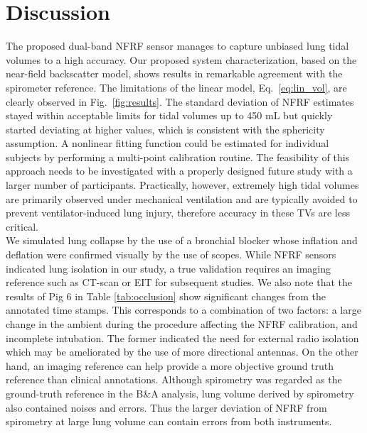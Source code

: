 \documentclass[journal]{IEEEtran}
\begin{document}
\section{Discussion}
The proposed dual-band NFRF sensor manages to capture unbiased lung tidal volumes to a high accuracy. Our proposed system characterization, based on the near-field backscatter model, shows results in remarkable agreement with the spirometer reference. The limitations of the linear model, Eq.~\ref{eq:lin_vol}, are clearly observed in Fig.~\ref{fig:results}. The standard deviation of NFRF estimates stayed within acceptable limits for tidal volumes up to 450 mL but quickly started deviating at higher values, which is consistent with the sphericity assumption. A nonlinear fitting function could be estimated for individual subjects by performing a multi-point calibration routine. The feasibility of this approach needs to be investigated with a properly designed future study with a larger number of participants. Practically, however, extremely high tidal volumes are primarily observed under mechanical ventilation and are typically avoided to prevent ventilator-induced lung injury, therefore accuracy in these TVs are less critical.\\
We simulated lung collapse by the use of a bronchial blocker whose inflation and deflation were confirmed visually by the use of scopes. While NFRF sensors indicated lung isolation in our study, a true validation requires an imaging reference such as CT-scan or EIT for subsequent studies. We also note that the results of Pig 6 in Table \ref{tab:occlusion} show significant changes from the annotated time stamps. This corresponds to a combination of two factors: a large change in the ambient during the procedure affecting the NFRF calibration, and incomplete intubation. The former indicated the need for external radio isolation which may be ameliorated by the use of more directional antennas. On the other hand, an imaging reference can help provide a more objective ground truth reference than clinical annotations. Although spirometry was regarded as the ground-truth reference in the B\&A analysis, lung volume derived by spirometry also contained noises and errors.  Thus the larger deviation of NFRF from spirometry at large lung volume can contain errors from both instruments.\\
\end{document}
